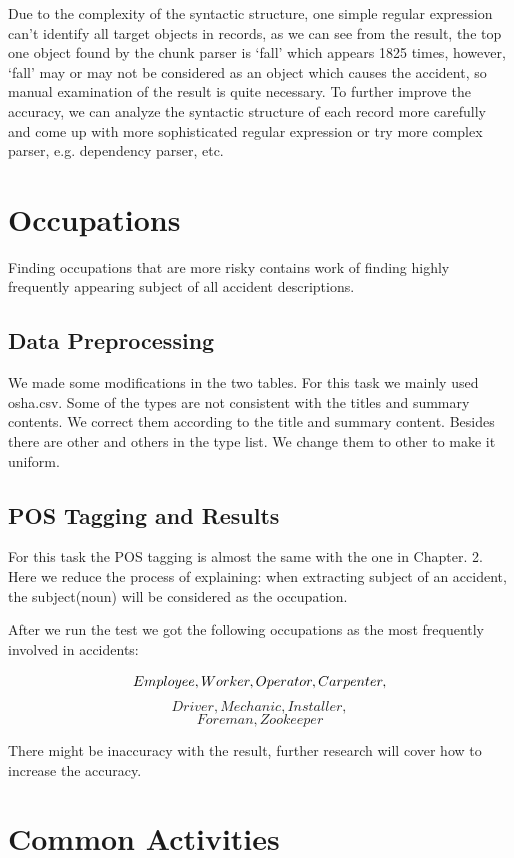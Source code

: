 \documentclass[DIV=calc, paper=a4, fontsize=11pt, twocolumn]{scrartcl}	 %
\begin{document}
Due to the complexity of the syntactic structure, one simple regular
expression can’t identify all target objects in records, as we can see
from the result, the top one object found by the chunk parser is
‘fall’ which appears 1825 times, however, ‘fall’ may or may not be
considered as an object which causes the accident, so manual
examination of the result is quite necessary. To further improve the
accuracy, we can analyze the syntactic structure of each record more
carefully and come up with more sophisticated regular expression or
try more complex parser, e.g. dependency parser, etc.



\section{Occupations}

Finding occupations that are more risky contains work of finding
highly frequently appearing subject of all accident descriptions.

\subsection{Data Preprocessing}
We made some modifications in the two tables. For this task we mainly
used osha.csv. Some of the types are not consistent with the titles
and summary contents. We correct them according to the title and
summary content. Besides there are other and others in the type
list. We change them to other to make it uniform.


\subsection{POS Tagging and Results}

For this task the POS tagging is almost the same with the one in
Chapter. 2. Here we reduce the process of explaining: when extracting
subject of an accident, the subject(noun) will be considered as the
occupation.

After we run the test we got the following occupations as the most
frequently involved in accidents:

{\bf $$\small Employee, Worker, Operator, Carpenter,$$
$$Driver, Mechanic, Installer,$$
$$Foreman, Zookeeper$$}

There might be inaccuracy with the result, further research will cover
how to increase the accuracy.


\section{Common Activities}
\end{document}
